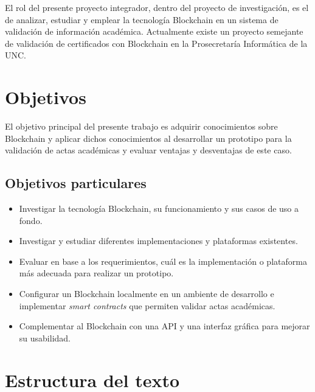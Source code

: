 El rol del presente proyecto integrador, dentro del proyecto de investigación, es el de analizar, estudiar y emplear la tecnología Blockchain en un sistema de validación de información académica. Actualmente existe un proyecto semejante de validación de certificados con Blockchain en la Prosecretaría Informática de la UNC.\cite{paper_montes}

\section{Objetivos}

El objetivo principal del presente trabajo es adquirir conocimientos sobre Blockchain y aplicar dichos conocimientos al desarrollar un prototipo para la validación de actas académicas y evaluar ventajas y desventajas de este caso.

\subsection{Objetivos particulares}
\begin{itemize}
    \item Investigar la tecnología Blockchain, su funcionamiento y sus casos de uso a fondo.
    \item Investigar y estudiar diferentes implementaciones y plataformas existentes.
    \item Evaluar en base a los requerimientos, cuál es la implementación o plataforma más adecuada para realizar un prototipo.
    \item Configurar un Blockchain localmente en un ambiente de desarrollo e implementar \textit{smart contracts} que permiten validar actas académicas.
    \item Complementar al Blockchain con una API y una interfaz gráfica para mejorar su usabilidad.
\end{itemize}

\section{Estructura del texto}

